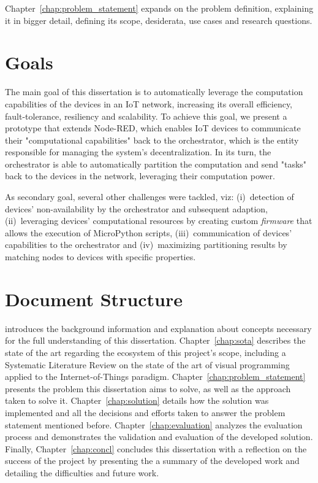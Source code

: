 Chapter~\ref{chap:problem_statement} expands on the problem definition, explaining it in bigger detail, defining its scope, desiderata, use cases and research questions.

\section{Goals} \label{sec:goals}

The main goal of this dissertation is to automatically leverage the computation capabilities of the devices in an IoT network, increasing its overall efficiency, fault-tolerance, resiliency and scalability. To achieve this goal, we present a prototype that extends Node-RED, which enables IoT devices to communicate their "computational capabilities" back to the orchestrator, which is the entity responsible for managing the system's decentralization. In its turn, the orchestrator is able to automatically partition the computation and send "tasks" back to the devices in the network, leveraging their computation power.

As secondary goal, several other challenges were tackled, viz: (i)~detection of devices' non-availability by the orchestrator and subsequent adaption, (ii)~leveraging devices' computational resources by creating custom \textit{firmware} that allows the execution of MicroPython scripts, (iii)~communication of devices' capabilities to the orchestrator and (iv)~maximizing partitioning results by matching nodes to devices with specific properties.

\section{Document Structure} \label{sec:document structure}

 introduces the background information and explanation about concepts necessary for the full understanding of this dissertation. Chapter~\ref{chap:sota} describes the state of the art regarding the ecosystem of this project's scope, including a Systematic Literature Review on the state of the art of visual programming applied to the Internet-of-Things paradigm. Chapter~\ref{chap:problem_statement} presents the problem this dissertation aims to solve, as well as the approach taken to solve it. Chapter~\ref{chap:solution} details how the solution was implemented and all the decisions and efforts taken to answer the problem statement mentioned before. Chapter~\ref{chap:evaluation} analyzes the evaluation process and demonstrates the validation and evaluation of the developed solution. Finally, Chapter~\ref{chap:concl} concludes this dissertation with a reflection on the success of the project by presenting the a summary of the developed work and detailing the difficulties and future work.

